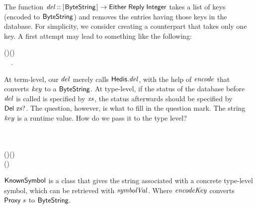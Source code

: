 The \Hedis{} function \ensuremath{\Varid{del}\mathbin{::}[\mskip1.5mu \Conid{ByteString}\mskip1.5mu]\to \Conid{Either}\;\Conid{Reply}\;\Conid{Integer}} takes a list
of keys (encoded to \ensuremath{\Conid{ByteString}}) and removes the entries having those keys in
the database. For simplicity, we consider creating a \Edis{} counterpart
that takes only one key. A first attempt may lead to something like the
following:
\begin{hscode}\SaveRestoreHook
{}%
%
\>[B]{}\mathbin{::}\to {}\;\;(\;)\;(\;\;){}\<[E]%
\\
\>[B]{}\;\mathrel{=}\mathbin{\$}~~.{}\<[E]%
\ColumnHook
\end{hscode}\resethooks
At term-level, our \ensuremath{\Varid{del}} merely calls \ensuremath{\Varid{\Conid{Hedis}.del}}, with the help of \ensuremath{\Varid{encode}}
that converts \ensuremath{\Varid{key}} to a \ensuremath{\Conid{ByteString}}. At type-level, if the status of the database before \ensuremath{\Varid{del}} is called is specified by \ensuremath{\Varid{xs}}, the status afterwards
should be specified by \ensuremath{\Conid{Del}\;\Varid{xs}\mathbin{?}}. The question, however, is what to fill in
the question mark. The string \ensuremath{\Varid{key}} is a runtime value. How do we pass it to
the type level?


\begin{hscode}\SaveRestoreHook
{}%
%
%
\>[B]{}\mathbin{::}\;\<[E]%
\\
\>[B]{}\<[5]%
\>[5]{}\Rightarrow {}\;\<[E]%
\\
\>[B]{}\<[5]%
\>[5]{}\to {}\;\;(\;\;)\;(\;\;){}\<[E]%
\\
\>[B]{}\;\mathrel{=}\mathbin{\$}\;(\;){}\<[E]%
\ColumnHook
\end{hscode}\resethooks

\ensuremath{\Conid{KnownSymbol}} is a class that gives the string associated
 with a concrete type-level symbol, which can be retrieved with
 \ensuremath{\Varid{symbolVal}}.\footnotemark
 Where \ensuremath{\Varid{encodeKey}} converts \ensuremath{\Conid{Proxy}\;\Varid{s}} to
 \ensuremath{\Conid{ByteString}}.


